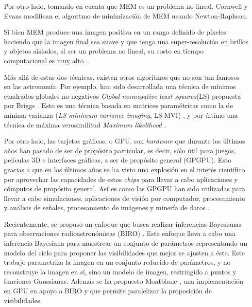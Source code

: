 Por otro lado, tomando en cuenta que MEM es un problema no lineal, Cornwell y Evans \citep{smemda} modifican el algoritmo de minimización de MEM usando Newton-Raphson.

Si bien MEM produce una imagen positiva en un rango definido de píxeles haciendo que la imagen final sea suave y que tenga una super-resolución en brillos y objetos aislados, al ser un problema no lineal, su costo en tiempo computacional es muy alto \citep{libroAstro2}.




Más allá de estas dos técnicas, existen otros algoritmos que no son tan famosos en las astronomía. Por ejemplo, han sido desarrollada una técnica de mínimos cuadrados globales no-negativos \textit{Global nonnegative least squares}(LS) propuesta por Briggs \citep{briggs1995}. Esto es una técnica basada en matrices paramétricas como la de mínima varianza (\textit{LS minimum variance imaging}, LS-MVI) \citep{Lesheradioastronomical}, y por último una técnica de máxima verosimilitud \textit{Maximum likelihood} \citep{BenDavid:2008ff}.

Por otro lado, las tarjetas gráficas, o GPU, son \textit{hardware} que durante los últimos años han pasado de ser de propósito particular, es decir, sólo útil para juegos, películas 3D e interfaces gráficas, a ser de propósito general (GPGPU). Esto gracias a que en los últimos años se ha visto una explosión en el interés científico por aprovechar las capacidades de estos \textit{chips} para llevar a cabo aplicaciones y cómputos de propósito general. Así es como las GPGPU han sido utilizadas para llevar a cabo simulaciones, aplicaciones de visión por computador, procesamiento y análisis de señales, procesamiento de imágenes y minería de datos \citep{Owens:2007:ASO}.


Recientemente, se propuso un enfoque que busca realizar inferencias Bayesianas para observaciones radioastronómicas (BIRO) \citep{BIRO}. Este enfoque lleva a cabo una inferencia Bayesiana para muestrear un conjunto de parámetros representando un modelo del cielo para proponer las visibilidades que mejor se ajusten a éste. Este trabajo parametriza la imagen en un conjunto reducido de parámetros, y no reconstruye la imagen en sí, sino un modelo de imagen, restringido a puntos y funciones Gaussianas. Además se ha propuesto Montblanc \citep{montblanc}, una implementación en GPU en apoyo a BIRO y que permite paralelizar la proposición de visibilidades.

